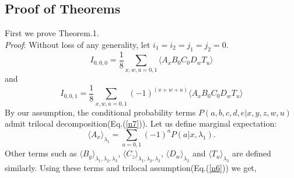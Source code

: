\documentclass[pra,10pt,twocolumn,superscriptaddress,floatfix,showpacs]{revtex4-1}
\begin{document}
\subsection{Proof of Theorems}\label{A}
First we prove Theorem.1.\\
\textit{Proof}: Without loss of any generality, let $i_1=i_2=j_1=j_2=0.$
\begin{equation}\label{S1}
I_{0,0,0}=\frac{1}{8}\sum \limits_{x, w, u=0,1}\langle A_x B_{0} C_{0} D_w T_u\rangle
\end{equation}
and
\begin{equation}\label{S2}
I_{0,0,1}=\frac{1}{8}\sum \limits_{x, w,u=0,1}(-1)^{(x+w+u)}\langle A_x B_{0} C_{0} D_w T_u\rangle
\end{equation}
By our assumption, the conditional probability terms $P(a,b,c,d,e|x,y,z,w,u)$ admit trilocal decomposition(Eq.(\ref{n7})). Let us define marginal expectation:
\begin{equation}\label{S3}
    \langle A_x\rangle_{\lambda_1}=\sum_{a=0,1}(-1)^a P(a|x,\lambda_1).
\end{equation}
Other terms such as $\langle B_y\rangle_{\lambda_1,\lambda_2,\lambda_3}$, $\langle C_z\rangle_{\lambda_1,\lambda_2,\lambda_3}$, $\langle D_w\rangle_{\lambda_2}$ and $\langle T_u\rangle_{\lambda_3}$ are defined similarly. Using these terms  and trilocal assumption(Eq.(\ref{n6})) we get,
\end{document}
